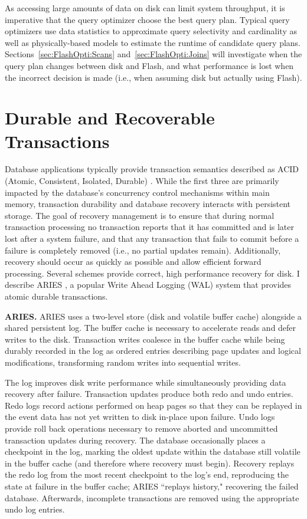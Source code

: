 As accessing large amounts of data on disk can limit system throughput, it is imperative that the query optimizer choose the best query plan.
Typical query optimizers use data statistics to approximate query selectivity and cardinality as well as physically-based models to estimate the runtime of candidate query plans.
Sections~\ref{sec:FlashOpti:Scans} and~\ref{sec:FlashOpti:Joins} will investigate when the query plan changes between disk and Flash, and what performance is lost when the incorrect decision is made (i.e., when assuming disk but actually using Flash).

\section{Durable and Recoverable Transactions}
\label{sec:Background:Recovery}

Database applications typically provide transaction semantics described as ACID (Atomic, Consistent, Isolated, Durable) \cite{Gray81}.
While the first three are primarily impacted by the database's concurrency control mechanisms within main memory, transaction durability and database recovery interacts with persistent storage.
The goal of recovery management is to ensure that during normal transaction processing no transaction reports that it has committed and is later lost after a system failure, and that any transaction that fails to commit before a failure is completely removed (i.e., no partial updates remain).
Additionally, recovery should occur as quickly as possible and allow efficient forward processing.
Several schemes provide correct, high performance recovery for disk.
I describe ARIES \cite{MohanHaderle92}, a popular Write Ahead Logging (WAL) system that provides atomic durable transactions.

\textbf{ARIES.}
ARIES uses a two-level store (disk and volatile buffer cache) alongside a shared persistent log.
The buffer cache is necessary to accelerate reads and defer writes to the disk.
Transaction writes coalesce in the buffer cache while being durably recorded in the log as ordered entries describing page updates and logical modifications, transforming random writes into sequential writes.

The log improves disk write performance while simultaneously providing data recovery after failure.
Transaction updates produce both redo and undo entries.
Redo logs record actions performed on heap pages so that they can be replayed in the event data has not yet written to disk in-place upon failure.
Undo logs provide roll back operations necessary to remove aborted and uncommitted transaction updates during recovery.
The database occasionally places a checkpoint in the log, marking the oldest update within the database still volatile in the buffer cache (and therefore where recovery must begin).
Recovery replays the redo log from the most recent checkpoint to the log's end, reproducing the state at failure in the buffer cache; ARIES ``replays history," recovering the failed database.
Afterwards, incomplete transactions are removed using the appropriate undo log entries.

